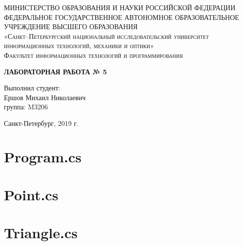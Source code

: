 \documentclass{article}
\begin{document}
        \begin{titlepage}
        \begin{center}
        \textsc{МИНИСТЕРСТВО ОБРАЗОВАНИЯ И НАУКИ РОССИЙСКОЙ ФЕДЕРАЦИИ ФЕДЕРАЛЬНОЕ ГОСУДАРСТВЕННОЕ АВТОНОМНОЕ ОБРАЗОВАТЕЛЬНОЕ УЧРЕЖДЕНИЕ ВЫСШЕГО ОБРАЗОВАНИЯ\\[5mm]
        «Санкт–Петербургский национальный исследовательский университет информационных технологий, механики и оптики»\\[20mm]
        Факультет информационных технологий и программирования\\[5mm]
        }
        \vfill
        
        \textbf{ЛАБОРАТОРНАЯ РАБОТА № 5 \\[20mm]}
        \end{center}
        
        \hfill
        \begin{minipage}{.3\textwidth}
        Выполнил студент:\\[2mm] 
        Ершов Михаил Николаевич \\
        группа: M3206\\[5mm]
        \end{minipage}%
        \vfill
        \begin{center}
        Санкт-Петербург, 2019 г.
        \end{center}
        \end{titlepage}
 
\section{Program.cs}
 
\newpage
\section{Point.cs}
 
\newpage
\section{Triangle.cs}
 

\newpage
\end{document}
